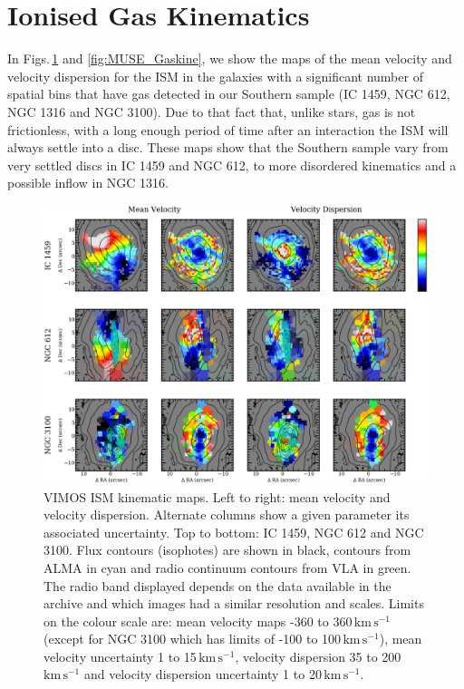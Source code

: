 



\section{Ionised Gas Kinematics}
	\label{sec:GasKin}
	In Figs.\,\ref{fig:VIMOS_Gaskine} and \ref{fig:MUSE_Gaskine}, we show the maps of the mean velocity and velocity dispersion for the ISM in the galaxies with a significant number of spatial bins that have gas detected in our Southern sample (IC 1459, NGC 612, NGC 1316 and NGC 3100). Due to that fact that, unlike stars, gas is not frictionless, with a long enough period of time after an interaction the ISM will always settle into a disc. These maps show that the Southern sample vary from very settled discs in IC 1459 and NGC 612, to more disordered kinematics and a possible inflow in NGC 1316.

	\begin{figure}
		\centering
		\includegraphics[height=0.47\textheight]{chapter5/vimos/kin.png}
		\caption[VIMOS ISM kinematic maps]{VIMOS ISM kinematic maps. Left to right: mean velocity and velocity dispersion. Alternate columns show a given parameter its associated uncertainty. Top to bottom: IC 1459, NGC 612 and NGC 3100. Flux contours (isophotes) are shown in black,  contours from ALMA in cyan and radio continuum contours from VLA in green. The radio band displayed depends on the data available in the archive and which images had a similar resolution and scales. Limits on the colour scale are: mean velocity maps -360 to 360\,$\mathrm{km \, s^{-1}}$ (except for NGC 3100 which has limits of -100 to 100\,$\mathrm{km \, s^{-1}}$), mean velocity uncertainty 1 to 15\,$\mathrm{km \, s^{-1}}$, velocity dispersion 35 to 200\,$\mathrm{km \, s^{-1}}$ and velocity dispersion uncertainty 1 to 20\,$\mathrm{km \, s^{-1}}$.} 
		\label{fig:VIMOS_Gaskine}
	\end{figure}

